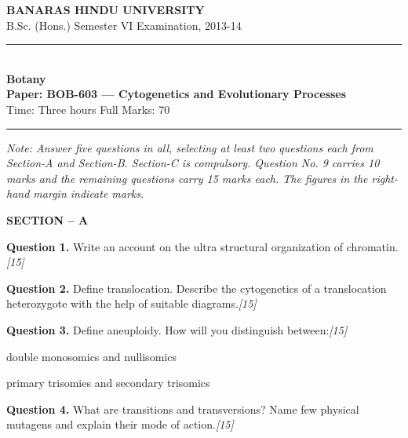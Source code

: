 \documentclass[11pt,a4paper]{article}
\newcommand{\pts}[1]{\hfill   \textit{[#1]}}
\begin{document}
\begin{center}
  {\large\bfseries BANARAS HINDU UNIVERSITY}\\[2pt]
  {\normalsize B.Sc. (Hons.) Semester VI Examination, 2013-14}\\[6pt]
  \rule{0.8\linewidth}{0.5pt}\\[6pt]
  {\large\bfseries Botany}\\[4pt]
  {\large\bfseries Paper: BOB-603 --- Cytogenetics and Evolutionary Processes}\\[4pt]
  {\normalsize Time: Three hours \hfill Full Marks: 70}
\end{center}

\rule{\linewidth}{0.4pt}

\smallskip



\noindent   \textit{Note: Answer five questions in all, selecting at least two questions each from Section-A and Section-B. Section-C is compulsory. Question No. 9 carries 10 marks and the remaining questions carry 15 marks each. The figures in the right-hand margin indicate marks.}

\bigskip

\begin{center}
   \textbf{SECTION -- A}
\end{center}

\medskip


\noindent   \textbf{Question 1.} Write an account on the ultra structural organization of chromatin.\pts{15}

\medskip


\noindent   \textbf{Question 2.} Define translocation. Describe the cytogenetics of a translocation heterozygote with the help of suitable diagrams.\pts{15}

\medskip


\noindent   \textbf{Question 3.} Define aneuploidy. How will you distinguish between:\pts{15}

\begin{parts}
  \item double monosomics and nullisomics
  \item primary trisomies and secondary trisomics
\end{parts}

\medskip


\noindent   \textbf{Question 4.} What are transitions and transversions? Name few physical mutagens and explain their mode of action.\pts{15}

\bigskip
\end{document}
